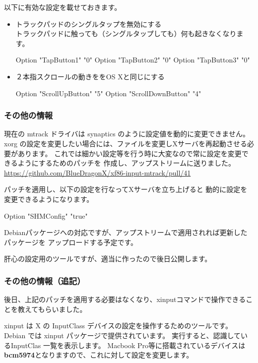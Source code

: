 \documentclass[mingoth,a4paper]{jsarticle}
\begin{document}
\clearpage

以下に有効な設定を載せておきます。
\begin{itemize}
\item トラックパッドのシングルタップを無効にする\\
トラックパッドに触っても（シングルタップしても）何も起きなくなります。
\begin{commandline}
Option "TapButton1" "0"
Option "TapButton2" "0"
Option "TapButton3" "0"
\end{commandline}

\item ２本指スクロールの動きををOS Xと同じにする
\begin{commandline}
Option "ScrollUpButton" "5"
Option "ScrollDownButton" "4"
\end{commandline}

\end{itemize}

\subsubsection{その他の情報}
現在の mtrack ドライバは synaptics のように設定値を動的に変更できません。
xorg の設定を変更したい場合には、ファイルを変更しXサーバを再起動させる必要があります。
これでは細かい設定等を行う時に大変なので常に設定を変更できるようにするためのパッチを
作成し、アップストリームに送りました。
\url{https://github.com/BlueDragonX/xf86-input-mtrack/pull/41}

パッチを適用し、以下の設定を行なってXサーバを立ち上げると
動的に設定を変更できるようになります。
\begin{commandline}
Option "SHMConfig" "true"
\end{commandline}
Debianパッケージへの対応ですが、アップストリームで適用されれば更新したパッケージを
アップロードする予定です。

肝心の設定用のツールですが、適当に作ったので後日公開します。

\subsubsection{その他の情報（追記）}
後日、上記のパッチを適用する必要はなくなり、xinputコマンドで操作できることを教えてもらいました。

xinput は X の InputClass デバイスの設定を操作するためのツールです。
Debian では xinput パッケージで提供されています。
実行すると、認識しているInputClas 一覧を表示します。
Macbook Pro等に搭載されているデバイスは{\bf bcm5974}となりますので、これに対して設定を変更します。
\end{document}
